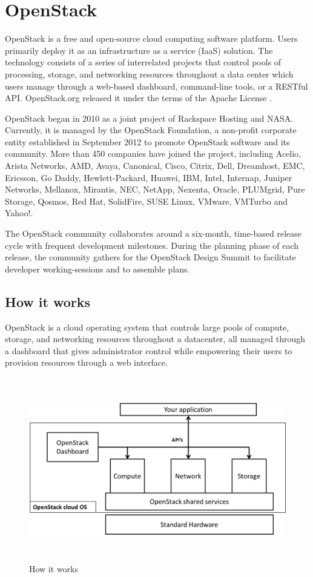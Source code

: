 \section{OpenStack}
OpenStack is a free and open-source cloud computing software platform. Users primarily deploy it as an infrastructure as a service (IaaS) solution. The technology consists of a series of interrelated projects that control pools of processing, storage, and networking resources throughout a data center which users manage through a web-based dashboard, command-line tools, or a RESTful API. OpenStack.org released it under the terms of the Apache License \cite{chen} \cite{openstack}.
\par
OpenStack began in 2010 as a joint project of Rackspace Hosting and NASA. Currently, it is managed by the OpenStack Foundation, a non-profit corporate entity established in September 2012 to promote OpenStack software and its community. More than 450 companies have joined the project, including Acelio, Arista Networks, AMD, Avaya, Canonical, Cisco, Citrix, Dell, Dreamhost, EMC, Ericsson, Go Daddy, Hewlett-Packard, Huawei, IBM, Intel, Internap, Juniper Networks, Mellanox, Mirantis, NEC, NetApp, Nexenta, Oracle, PLUMgrid, Pure Storage, Qosmos, Red Hat, SolidFire, SUSE Linux, VMware, VMTurbo and Yahoo!\cite{openstack}.
\par
The OpenStack community collaborates around a six-month, time-based release cycle with frequent development milestones. During the planning phase of each release, the community gathers for the OpenStack Design Summit to facilitate developer working-sessions and to assemble plans\cite{openstack}.
\par

\subsection{How it works}
    OpenStack is a cloud operating system that controls large pools of compute, storage, and networking resources throughout a datacenter, all managed through a dashboard that gives administrator control while empowering their users to provision resources through a web interface\cite{openstack}.
    \begin{figure}[h]
     \centering
     \includegraphics[height=8cm,width=14cm]{images/hiw.png}
     \caption{How it works }%
    \end{figure}
 
